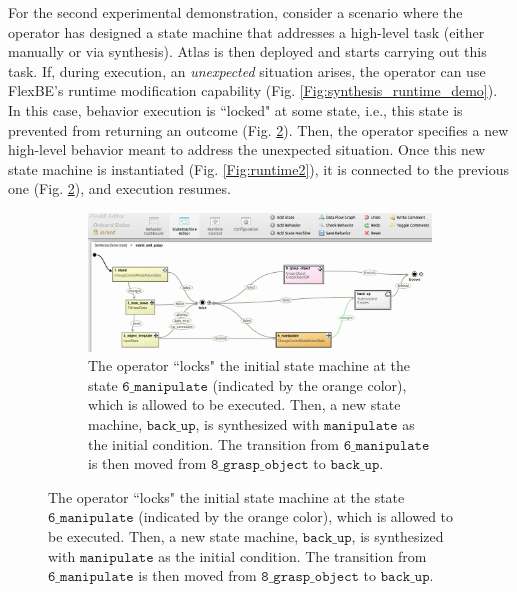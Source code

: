 For the second experimental demonstration, consider a scenario where the operator has designed a state machine that addresses a high-level task (either manually or via synthesis).
Atlas is then deployed and starts carrying out this task.
If, during execution, an \emph{unexpected} situation arises, the operator can use FlexBE's runtime modification capability (Fig. \ref{Fig:synthesis_runtime_demo}).
In this case, behavior execution is ``locked" at some state, i.e., this state is prevented from returning an outcome (Fig. \ref{Fig:runtime1}). 
Then, the operator specifies a new high-level behavior meant to address the unexpected situation.
Once this new state machine is instantiated (Fig. \ref{Fig:runtime2}), it is connected to the previous one (Fig. \ref{Fig:runtime1}), and execution resumes.

\begin{figure}[t]
	\centering
	\begin{subfigure}[b]{0.99\columnwidth}
	\includegraphics[width=0.99\columnwidth, clip]{./img/synthesis_runtime_connect_sm.png}
	\caption{The operator ``locks" the initial state machine at the state $\mathtt{6\_manipulate}$ (indicated by the orange color), which is allowed to be executed.
	Then, a new state machine, $\mathtt{back\_up}$, is synthesized with $\mathtt{manipulate}$ as the initial condition.
	The transition from $\mathtt{6\_manipulate}$ is then moved from $\mathtt{8\_grasp\_object}$ to $\mathtt{back\_up}$.
	} 
	\label{Fig:runtime1}
	\end{subfigure}
	

\end{figure}
